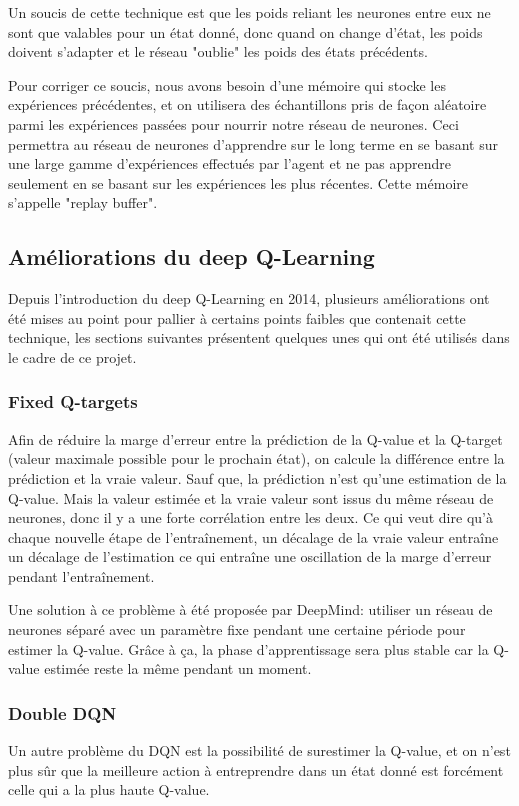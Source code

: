 \documentclass[a4paper,10pt,openany,oneside]{report}
\begin{document}
Un soucis de cette technique est que les poids reliant les neurones entre eux ne sont que valables pour un état donné, donc quand on change d'état, les poids doivent s'adapter et le réseau "oublie" les poids des états précédents.

Pour corriger ce soucis, nous avons besoin d'une mémoire qui stocke les expériences précédentes, et on utilisera des échantillons pris de façon aléatoire parmi les expériences passées pour nourrir notre réseau de neurones. Ceci permettra au réseau de neurones d'apprendre sur le long terme en se basant sur une large gamme d'expériences effectués par l'agent et ne pas apprendre seulement en se basant sur les expériences les plus récentes. Cette mémoire s'appelle "replay buffer".
\subsection{Améliorations du deep Q-Learning}
Depuis l'introduction du deep Q-Learning en 2014, plusieurs améliorations ont été mises au point pour pallier à certains points faibles que contenait cette technique, les sections suivantes présentent quelques unes qui ont été utilisés dans le cadre de ce projet.
\subsubsection{Fixed Q-targets}
Afin de réduire la marge d'erreur entre la prédiction de la Q-value et la Q-target (valeur maximale possible pour le prochain état), on calcule la différence entre la prédiction et la vraie valeur. Sauf que, la prédiction n'est qu'une estimation de la Q-value. Mais la valeur estimée et la vraie valeur sont issus du même réseau de neurones, donc il y a une forte corrélation entre les deux. Ce qui veut dire qu'à chaque nouvelle étape de l'entraînement, un décalage de la vraie valeur entraîne un décalage de l'estimation ce qui entraîne une oscillation de la marge d'erreur pendant l'entraînement.

Une solution à ce problème à été proposée par DeepMind: utiliser un réseau de neurones séparé avec un paramètre fixe pendant une certaine période pour estimer la Q-value. Grâce à ça, la phase d'apprentissage sera plus stable car la Q-value estimée reste la même pendant un moment.
\subsubsection{Double DQN}
Un autre problème du DQN est la possibilité de surestimer la Q-value, et on n'est plus sûr que la meilleure action à entreprendre dans un état donné est forcément celle qui a la plus haute Q-value.
\end{document}
